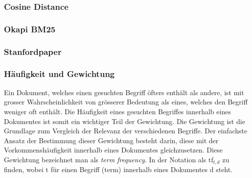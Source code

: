 
\subsubsection{Cosine Distance}




\subsubsection{Okapi BM25}



\subsubsection{Stanfordpaper}




\subsubsection{Häufigkeit und Gewichtung}\label{gewichtung}


Ein Dokument, welches einen gesuchten Begriff öfters enthält als andere, ist mit grosser Wahrscheinlichkeit von grösserer Bedeutung als eines, welches den Begriff weniger oft enthält. Die Häufigkeit eines gesuchten Begriffes innerhalb eines Dokumentes ist somit ein wichtiger Teil der Gewichtung. Die Gewichtung ist die Grundlage zum Vergleich der Relevanz der verschiedenen Begriffe. Der einfachste Ansatz der Bestimmung dieser Gewichtung besteht darin, diese mit der Vorkommenshäufigkeit innerhalb eines Dokumentes gleichzusetzen. Diese Gewichtung bezeichnet man als \textit{term frequency}. In der Notation als $\text{tf}_{t,d}$ zu finden, wobei $\text{t}$ für einen Begriff (term) innerhalb eines Dokumentes $\text{d}$ steht.

